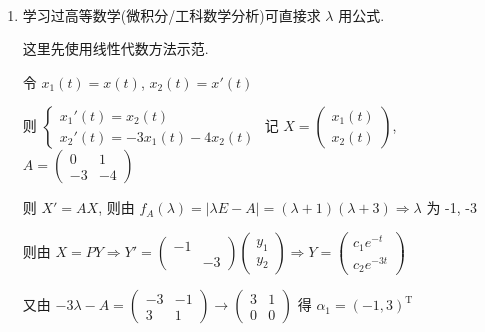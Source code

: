      \paragraph{} %
         \begin{enumerate}
             \item %
                   学习过高等数学(微积分/工科数学分析)可直接求 \(\lambda\) 用公式.

                   这里先使用线性代数方法示范.

                   令 \( x_{1}(t) = x(t) \), \( x_{2}(t) = x'(t) \)

                   则 \( \begin{cases}
                       x_{1}'(t) = x_{2}(t) \\
                       x_{2}'(t) = -3x_{1}(t) - 4x_{2}(t)
                   \end{cases} \) 记 \( X = \begin{pmatrix}
                       x_{1}(t) \\
                       x_{2}(t)
                   \end{pmatrix} \), \( A = \begin{pmatrix}
                       0  & 1  \\
                       -3 & -4
                   \end{pmatrix} \)

                   则 \( X' = AX \), 则由 \( f_{A}(\lambda) = |\lambda E - A| = (\lambda+1)(\lambda+3) \Rightarrow \lambda \) 为 -1, -3

                   则由 \( X = P Y \Rightarrow Y' = \begin{pmatrix}
                       -1 &    \\
                          & -3
                   \end{pmatrix}\begin{pmatrix}
                       y_{1} \\
                       y_{2}
                   \end{pmatrix} \Rightarrow Y = \begin{pmatrix}
                       c_{1}e^{-t} \\
                       c_{2}e^{-3t}
                   \end{pmatrix} \)

                   又由 \( -3\lambda-A = \begin{pmatrix}
                       -3 & -1 \\
                       3  & 1
                   \end{pmatrix} \rightarrow \begin{pmatrix}
                       3 & 1 \\
                       0 & 0
                   \end{pmatrix} \) 得 \( \alpha_{1} = (-1, 3)^{\mathrm{T}} \)


\end{enumerate}
